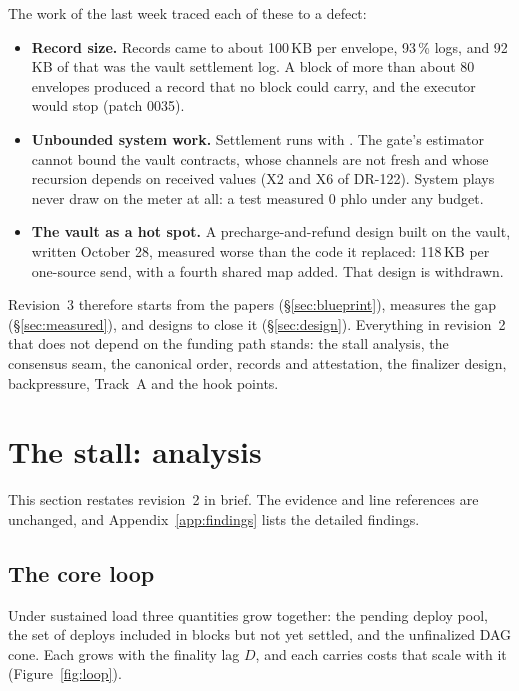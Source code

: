 \documentclass[11pt]{article}
\newcommand{\code}{\path}
\begin{document}
The work of the last week traced each of these to a defect:
\begin{itemize}
\item \textbf{Record size.} Records came to about 100\,KB per envelope, 93\,\% logs, and 92\,KB of that was the vault settlement log. A block of more than about 80 envelopes produced a record that no block could carry, and the executor would stop (patch 0035).
\item \textbf{Unbounded system work.} Settlement runs with \code{Cost::unsafe_max()}. The gate's estimator cannot bound the vault contracts, whose channels are not fresh and whose recursion depends on received values (X2 and X6 of DR-122). System plays never draw on the meter at all: a test measured 0 phlo under any budget.
\item \textbf{The vault as a hot spot.} A precharge-and-refund design built on the vault, written October 28, measured worse than the code it replaced: 118\,KB per one-source send, with a fourth shared map added. That design is withdrawn.
\end{itemize}

Revision~3 therefore starts from the papers (\S\ref{sec:blueprint}), measures the gap (\S\ref{sec:measured}), and designs to close it (\S\ref{sec:design}). Everything in revision~2 that does not depend on the funding path stands: the stall analysis, the consensus seam, the canonical order, records and attestation, the finalizer design, backpressure, Track~A and the hook points.

\section{The stall: analysis}\label{sec:analysis}

This section restates revision~2 in brief. The evidence and line references are unchanged, and Appendix~\ref{app:findings} lists the detailed findings.

\subsection{The core loop}

Under sustained load three quantities grow together: the pending deploy pool, the set of deploys included in blocks but not yet settled, and the unfinalized DAG cone. Each grows with the finality lag $D$, and each carries costs that scale with it (Figure~\ref{fig:loop}).
\end{document}
